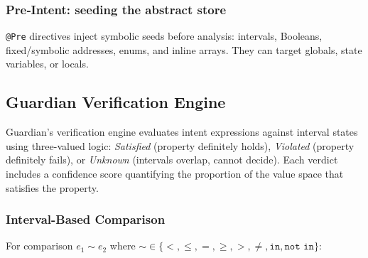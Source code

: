 \documentclass[pdflatex,sn-basic]{sn-jnl}%
\theoremstyle{thmstyleone}%
\theoremstyle{thmstyletwo}%
\theoremstyle{thmstylethree}%
\begin{document}
\subsubsection{Pre‑Intent: seeding the abstract store}
%
\texttt{@Pre} directives inject symbolic seeds before analysis:
intervals, Booleans, fixed/symbolic addresses, enums, and inline
arrays.  They can target globals, state variables, or locals.


\subsection{Guardian Verification Engine}
\label{sec:verification-engine}

Guardian's verification engine evaluates intent expressions against interval states using three-valued logic: \textit{Satisfied} (property definitely holds), \textit{Violated} (property definitely fails), or \textit{Unknown} (intervals overlap, cannot decide). Each verdict includes a confidence score quantifying the proportion of the value space that satisfies the property.

\subsubsection{Interval-Based Comparison}

For comparison $e_1 \sim e_2$ where $\sim \in \{<, \leq, =, \geq, >, \neq, \texttt{in}, \texttt{not in}\}$:
\end{document}
